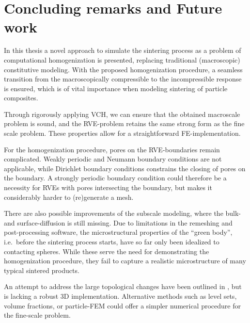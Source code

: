 \documentclass[MikaelDissertation.tex]{subfiles}
\begin{document}
\chapter{Concluding remarks and Future work}

In this thesis a novel approach to simulate the sintering process as a problem of computational homogenization is presented, replacing traditional (macroscopic) constitutive modeling.
With the proposed homogenization procedure, a seamless transition from the macroscopically compressible to the incompressible response is ensured, which is of vital importance when modeling sintering of particle composites.

Through rigorously applying VCH, we can ensure that the obtained macroscale problem is sound, and the RVE-problem retains the same strong form as the fine scale problem.
These properties allow for a straightforward FE-implementation.

For the homogenization procedure, pores on the RVE-boundaries remain complicated.
Weakly periodic and Neumann boundary conditions are not applicable, while Dirichlet boundary conditions constrains the closing of pores on the boundary.
A strongly periodic boundary condition could therefore be a necessity for RVEs with pores intersecting the boundary, but makes it considerably harder to (re)generate a mesh.


There are also possible improvements of the subscale modeling, where the bulk- and surface-diffusion is still missing.
Due to limitations in the remeshing and post-processing software, the microstructural properties of the ``green body'', i.e.\ before the sintering process starts, have so far only been idealized to contacting spheres.
While these serve the need for demonstrating the homogenization procedure, they fail to capture a realistic microstructure of many typical sintered products.

An attempt to address the large topological changes have been outlined in , but is lacking a robust 3D implementation.
Alternative methods such as level sets, volume fractions, or particle-FEM could offer a simpler numerical procedure for the fine-scale problem.
\end{document}
